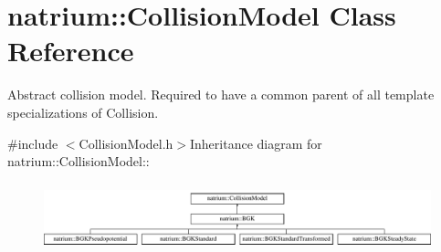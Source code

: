 \hypertarget{classnatrium_1_1CollisionModel}{
\section{natrium::CollisionModel Class Reference}
\label{classnatrium_1_1CollisionModel}
}


Abstract collision model. Required to have a common parent of all template specializations of Collision.  


{\ttfamily \#include $<$CollisionModel.h$>$}Inheritance diagram for natrium::CollisionModel::\begin{figure}[H]
\begin{center}
\leavevmode
\includegraphics[height=1.96262cm]{classnatrium_1_1CollisionModel}
\end{center}
\end{figure}
